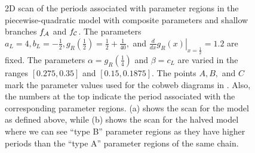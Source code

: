 \begin{figure}
	\centering
	\caption[2D scan of the periods associated with the parameter regions in the piecewise-quadratic model with composite parameters and shallow branches]{
	2D scan of the periods associated with parameter regions in the piecewise-quadratic model with composite parameters and shallow branches $f_{\mathcal{A}}$ and $f_{\mathcal{C}}$.
	The parameters $a_L = 4, b_L = -\frac{1}{2}, g_R\left(\frac{1}{2}\right) = \frac{1}{2} + \frac{1}{40},$ and $\left. \frac{d}{dx} g_R\left(x\right) \right|_{x = \frac{1}{2}} = 1.2$ are fixed.
	The parameters $\alpha = g_R\left(\frac{1}{4}\right)$ and $\beta = c_L$ are varied in the ranges $[0.275, 0.35]$ and $[0.15, 0.1875]$.
	The points $A, B,$ and $C$ mark the parameter values used for the cobweb diagrams in .
	Also, the numbers at the top indicate the period associated with the corresponding parameter regions.
	(a) shows the scan for the model as defined above, while (b) shows the scan for the halved model where we can see ``type B'' parameter regions as they have higher periods than the ``type A'' parameter regions of the same chain.
	}
	\label{fig:setup.quad.hyper.2.period}
\end{figure}

